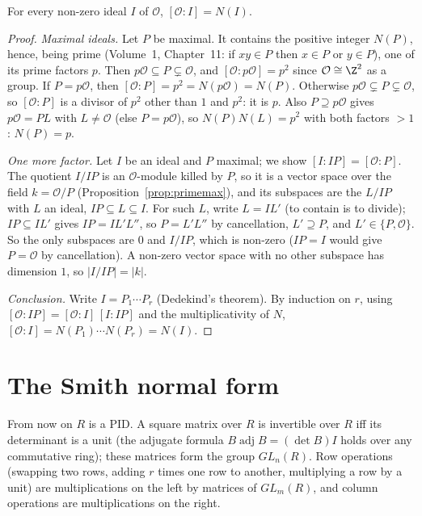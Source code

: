 \begin{theorem}\label{thm:normindex}
For every non-zero ideal $I$ of $\mathcal O$, $[\mathcal O:I]=N(I)$.
\end{theorem}
\begin{proof}
\emph{Maximal ideals.} Let $P$ be maximal. It contains the positive integer $N(P)$, hence, being prime (Volume~1, Chapter~11: if $xy\in P$ then $x\in P$ or $y\in P$), one of its prime factors $p$. Then $p\mathcal O\subseteq P\subsetneq\mathcal O$, and $[\mathcal O:p\mathcal O]=p^2$ since $\mathcal O\cong\Z^2$ as a group. If $P=p\mathcal O$, then $[\mathcal O:P]=p^2=N(p\mathcal O)=N(P)$. Otherwise $p\mathcal O\subsetneq P\subsetneq\mathcal O$, so $[\mathcal O:P]$ is a divisor of $p^2$ other than $1$ and $p^2$: it is $p$. Also $P\supseteq p\mathcal O$ gives $p\mathcal O=PL$ with $L\ne\mathcal O$ (else $P=p\mathcal O$), so $N(P)N(L)=p^2$ with both factors $>1$: $N(P)=p$.

\emph{One more factor.} Let $I$ be an ideal and $P$ maximal; we show $[I:IP]=[\mathcal O:P]$. The quotient $I/IP$ is an $\mathcal O$-module killed by $P$, so it is a vector space over the field $k=\mathcal O/P$ (Proposition~\ref{prop:primemax}), and its subspaces are the $L/IP$ with $L$ an ideal, $IP\subseteq L\subseteq I$. For such $L$, write $L=IL'$ (to contain is to divide); $IP\subseteq IL'$ gives $IP=IL'L''$, so $P=L'L''$ by cancellation, $L'\supseteq P$, and $L'\in\{P,\mathcal O\}$. So the only subspaces are $0$ and $I/IP$, which is non-zero ($IP=I$ would give $P=\mathcal O$ by cancellation). A non-zero vector space with no other subspace has dimension $1$, so $|I/IP|=|k|$.

\emph{Conclusion.} Write $I=P_1\cdots P_r$ (Dedekind's theorem). By induction on $r$, using $[\mathcal O:IP]=[\mathcal O:I]\,[I:IP]$ and the multiplicativity of $N$, $[\mathcal O:I]=N(P_1)\cdots N(P_r)=N(I)$.
\end{proof}

\section{The Smith normal form}\label{sec:smith}

From now on $R$ is a PID. A square matrix over $R$ is invertible over $R$ iff its determinant is a unit (the adjugate formula $B\operatorname{adj}B=(\det B)I$ holds over any commutative ring); these matrices form the group $GL_n(R)$. Row operations (swapping two rows, adding $r$ times one row to another, multiplying a row by a unit) are multiplications on the left by matrices of $GL_m(R)$, and column operations are multiplications on the right.

